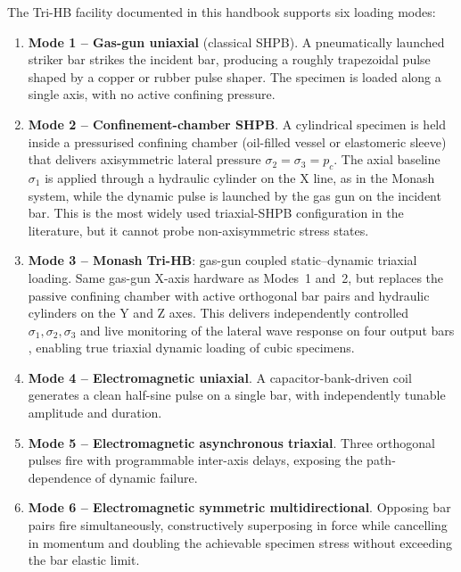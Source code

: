 \documentclass[11pt,a4paper,openany]{book}
\theoremstyle{handbook}
\newcommand{\sig}{\sigma}
\begin{document}
The Tri-HB facility documented in this handbook supports six loading modes:

\begin{enumerate}[leftmargin=2.4em,itemsep=4pt]
\item \textbf{Mode 1 -- Gas-gun uniaxial} (classical SHPB). A pneumatically
      launched striker bar strikes the incident bar, producing a roughly
      trapezoidal pulse shaped by a copper or rubber pulse shaper. The
      specimen is loaded along a single axis, with no active confining
      pressure.
\item \textbf{Mode 2 -- Confinement-chamber SHPB}. A cylindrical specimen
      is held inside a pressurised confining chamber (oil-filled vessel or
      elastomeric sleeve) that delivers axisymmetric lateral pressure
      $\sig_2=\sig_3=p_c$. The axial baseline $\sig_1$ is applied through
      a hydraulic cylinder on the X line, as in the Monash system, while
      the dynamic pulse is launched by the gas gun on the incident bar.
      This is the most widely used triaxial-SHPB configuration in the
      literature, but it cannot probe non-axisymmetric stress states.
\item \textbf{Mode 3 -- Monash Tri-HB}: gas-gun coupled static--dynamic
      triaxial loading. Same gas-gun X-axis hardware as Modes~1 and~2, but
      replaces the passive confining chamber with active orthogonal bar
      pairs and hydraulic cylinders on the Y and Z axes. This delivers
      independently controlled $\sig_1,\sig_2,\sig_3$ and live monitoring
      of the lateral wave response on four output bars
      \cite{Liu2019,Zhang2019Tri}, enabling true triaxial dynamic loading
      of cubic specimens.
\item \textbf{Mode 4 -- Electromagnetic uniaxial}. A capacitor-bank-driven
      coil generates a clean half-sine pulse on a single bar, with
      independently tunable amplitude and duration.
\item \textbf{Mode 5 -- Electromagnetic asynchronous triaxial}. Three
      orthogonal pulses fire with programmable inter-axis delays, exposing
      the path-dependence of dynamic failure.
\item \textbf{Mode 6 -- Electromagnetic symmetric multidirectional}.
      Opposing bar pairs fire simultaneously, constructively superposing in
      force while cancelling in momentum and doubling the achievable
      specimen stress without exceeding the bar elastic limit.
\end{enumerate}
\end{document}
